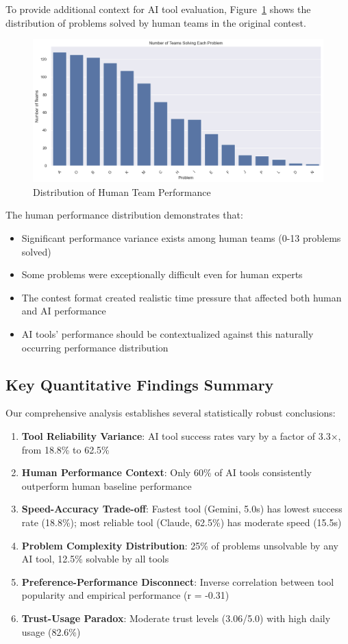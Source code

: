 \documentclass[conference]{IEEEtran}
\begin{document}
To provide additional context for AI tool evaluation, Figure~\ref{fig:human_performance} shows the distribution of problems solved by human teams in the original contest.

\begin{figure}[htbp]
\centering
\includegraphics[width=0.75\linewidth]{images/contest_images/number_of_teams_solving_each_problem.png}
\caption{Distribution of Human Team Performance}
\label{fig:human_performance}
\end{figure}

The human performance distribution demonstrates that:

\begin{itemize}
    \item Significant performance variance exists among human teams (0-13 problems solved)
    \item Some problems were exceptionally difficult even for human experts
    \item The contest format created realistic time pressure that affected both human and AI performance
    \item AI tools' performance should be contextualized against this naturally occurring performance distribution
\end{itemize}

\subsection{Key Quantitative Findings Summary}

Our comprehensive analysis establishes several statistically robust conclusions:

\begin{enumerate}
    \item \textbf{Tool Reliability Variance}: AI tool success rates vary by a factor of 3.3×, from 18.8\% to 62.5\%
    \item \textbf{Human Performance Context}: Only 60\% of AI tools consistently outperform human baseline performance
    \item \textbf{Speed-Accuracy Trade-off}: Fastest tool (Gemini, 5.0s) has lowest success rate (18.8\%); most reliable tool (Claude, 62.5\%) has moderate speed (15.5s)
    \item \textbf{Problem Complexity Distribution}: 25\% of problems unsolvable by any AI tool, 12.5\% solvable by all tools
    \item \textbf{Preference-Performance Disconnect}: Inverse correlation between tool popularity and empirical performance (r = -0.31)
    \item \textbf{Trust-Usage Paradox}: Moderate trust levels (3.06/5.0) with high daily usage (82.6\%)
\end{enumerate}
\end{document}

